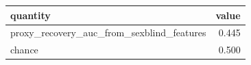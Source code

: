 \begin{tabular}{lr}
\toprule
quantity & value \\
\midrule
proxy_recovery_auc_from_sexblind_features & 0.445 \\
chance & 0.500 \\
\bottomrule
\end{tabular}
